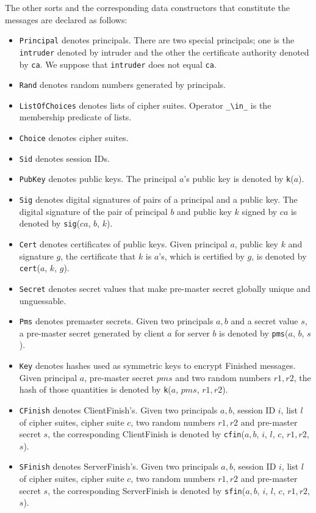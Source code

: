\documentclass[a4paper,fleqn]{cas-dc}
\begin{document}
The other sorts and the corresponding data
constructors that constitute the messages are declared as follows:
\begin{itemize}
  \item \verb!Principal! denotes principals. There are two special principals; one is the \verb!intruder! denoted by intruder and the other the certificate authority denoted by \verb!ca!. We suppose that \verb!intruder! does not equal \verb!ca!. 
  \item \verb!Rand! denotes random numbers generated by principals.
\item \verb!ListOfChoices! denotes lists of cipher suites. Operator \verb|_\in_| is the membership predicate of lists.
  \item \verb!Choice! denotes cipher suites. 
  \item \verb!Sid! denotes session IDs. 
  \item \verb!PubKey! denotes public keys. The principal $a$’s public key is denoted by \verb!k!($a$).
\item \verb!Sig! denotes digital signatures of pairs of a principal and a public key. The digital signature of the pair of principal $b$ and public key $k$ signed by $ca$ is denoted by \verb!sig!($ca$, $b$, $k$).
\item \verb!Cert! denotes certificates of public keys. Given principal $a$, public key $k$ and signature $g$, the certificate that $k$ is $a$’s,
which is certified by $g$, is denoted by \verb!cert!($a$, $k$, $g$).
\item \verb!Secret! denotes secret values that make pre-master secret globally unique and unguessable. 
\item \verb!Pms! denotes premaster secrets. Given two principals $a,b$ and a secret value $s$, a pre-master secret generated by client $a$ for server $b$ is denoted by \verb!pms!($a$, $b$, $s$).
\item \verb!Key! denotes hashes used as symmetric keys to encrypt Finished messages. Given principal $a$, pre-master secret $pms$ and two random numbers $r1,r2$, the hash of those quantities is denoted by \verb!k!($a$, $pms$, $r1, r2$).
\item \verb!CFinish! denotes ClientFinish’s. Given two principals $a, b$, session ID $i$, list $l$ of cipher suites, cipher suite $c$, two random numbers $r1, r2$ and pre-master secret $s$, the corresponding ClientFinish is denoted by \verb!cfin!($a, b$, $i$, $l$, $c$, $r1, r2$, $s$).
\item \verb!SFinish! denotes ServerFinish’s. Given two principals $a, b$, session ID $i$, list $l$ of cipher suites, cipher suite $c$, two random numbers $r1, r2$ and pre-master secret $s$, the corresponding ServerFinish is denoted by \verb!sfin!($a, b$, $i$, $l$, $c$, $r1, r2$, $s$).

\end{itemize}
\end{document}
